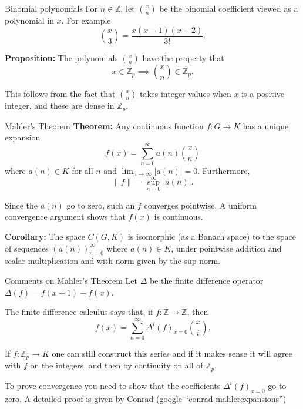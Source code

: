 \documentclass[
  ignorenonframetext,
]{beamer}
\begin{document}
\begin{frame}{Binomial polynomials}
\protect\hypertarget{binomial-polynomials}{}
For \(n\in \mathbb{Z}\), let \(\binom{x}{n}\) be the binomial
coefficient viewed as a polynomial in \(x\). For example \[
\binom{x}{3}=\frac{x(x-1)(x-2)}{3!}.
\]

\textbf{Proposition:} The polynomials \(\binom{x}{n}\) have the property
that \[
x\in\mathbb{Z}_p\implies \binom{x}{n}\in\mathbb{Z}_p.
\]

This follows from the fact that \(\binom{x}{n}\) takes integer values
when \(x\) is a positive integer, and these are dense in
\(\mathbb{Z}_p\).
\end{frame}

\begin{frame}{Mahler's Theorem}
\protect\hypertarget{mahlers-theorem}{}
\textbf{Theorem:} Any continuous function \(f:G\to K\) has a unique
expansion \[
f(x)=\sum_{n=0}^{\infty} a(n)\binom{x}{n}
\] where \(a(n)\in K\) for all \(n\) and \(\lim_{n\to\infty} |a(n)|=0\).
Furthermore, \[
\|f\|=\sup_{n=0}^{\infty} |a(n)|.
\]

Since the \(a(n)\) go to zero, such an \(f\) converges pointwise. A
uniform convergence argument shows that \(f(x)\) is continuous.

\textbf{Corollary:} The space \(C(G,K)\) is isomorphic (as a Banach
space) to the space of sequences \((a(n))_{n=0}^{\infty}\) where
\(a(n)\in K\), under pointwise addition and scalar multiplication and
with norm given by the sup-norm.
\end{frame}

\begin{frame}{Comments on Mahler's Theorem}
\protect\hypertarget{comments-on-mahlers-theorem}{}
Let \(\Delta\) be the finite difference operator
\(\Delta(f)=f(x+1)-f(x)\).

The finite difference calculus says that, if
\(f:\mathbb{Z}\to\mathbb{Z}\), then \[
f(x) = \sum_{n=0}^{\infty} \Delta^{i}(f)_{x=0}\binom{x}{i}.
\]

If \(f:\mathbb{Z}_p\to K\) one can still construct this series and if it
makes sense it will agree with \(f\) on the integers, and then by
continuity on all of \(\mathbb{Z}_p\).

To prove convergence you need to show that the coefficients
\(\Delta^{i}(f)_{x=0}\) go to zero. A detailed proof is given by Conrad
(google ``conrad mahlerexpansions'')
\end{frame}
\end{document}
